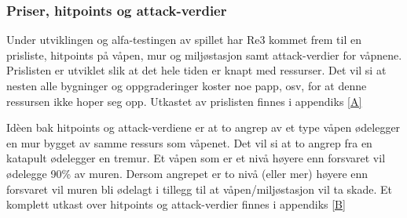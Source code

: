 \subsubsection{Priser, hitpoints og attack-verdier}
Under utviklingen og alfa-testingen av spillet har Re3 kommet frem til en prisliste, hitpoints på våpen, mur og miljøstasjon samt attack-verdier for våpnene.\\

Prislisten er utviklet slik at det hele tiden er knapt med ressurser. Det vil si at nesten alle bygninger og oppgraderinger koster noe papp, osv, for at denne ressursen ikke hoper seg opp. Utkastet av prislisten finnes i appendiks \ref{A}

Idèen bak hitpoints og attack-verdiene er at to angrep av et type våpen ødelegger en mur bygget av samme ressurs som våpenet. Det vil si at to angrep fra en katapult ødelegger en tremur. Et våpen som er et nivå høyere enn forsvaret vil ødelegge 90\% av muren. Dersom angrepet er to nivå (eller mer) høyere enn forsvaret vil muren bli ødelagt i tillegg til at våpen/miljøstasjon vil ta skade. Et komplett utkast over hitpoints og attack-verdier finnes i appendiks \ref{B}